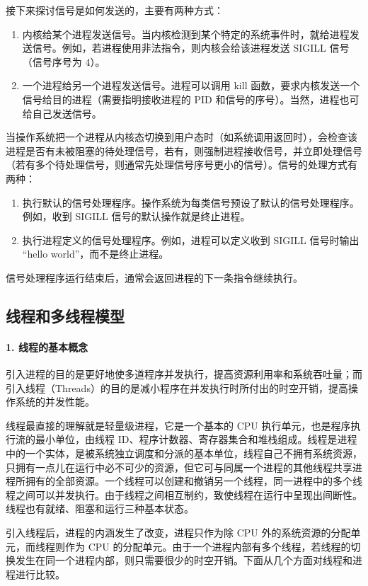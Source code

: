 \documentclass{ctexbook}
\begin{document}
	接下来探讨信号是如何发送的，主要有两种方式：
	\begin{enumerate}
		\item 内核给某个进程发送信号。当内核检测到某个特定的系统事件时，就给进程发送信号。例如，若进程使用非法指令，则内核会给该进程发送 SIGILL 信号（信号序号为 4）。
		\item 一个进程给另一个进程发送信号。进程可以调用 kill 函数，要求内核发送一个信号给目的进程（需要指明接收进程的 PID 和信号的序号）。当然，进程也可给自己发送信号。
	\end{enumerate}
	
	当操作系统把一个进程从内核态切换到用户态时（如系统调用返回时），会检查该进程是否有未被阻塞的待处理信号，若有，则强制进程接收信号，并立即处理信号（若有多个待处理信号，则通常先处理信号序号更小的信号）。信号的处理方式有两种：
	\begin{enumerate}
		\item 执行默认的信号处理程序。操作系统为每类信号预设了默认的信号处理程序。例如，收到 SIGILL 信号的默认操作就是终止进程。
		\item 执行进程定义的信号处理程序。例如，进程可以定义收到 SIGILL 信号时输出 “hello world”，而不是终止进程。
	\end{enumerate}
	
	信号处理程序运行结束后，通常会返回进程的下一条指令继续执行。
	
	\subsection{线程和多线程模型}
	
	\paragraph{1. 线程的基本概念}
	
	引入进程的目的是更好地使多道程序并发执行，提高资源利用率和系统吞吐量；而引入线程（Threads）的目的是减小程序在并发执行时所付出的时空开销，提高操作系统的并发性能。
	
	线程最直接的理解就是轻量级进程，它是一个基本的 CPU 执行单元，也是程序执行流的最小单位，由线程 ID、程序计数器、寄存器集合和堆栈组成。线程是进程中的一个实体，是被系统独立调度和分派的基本单位，线程自己不拥有系统资源，只拥有一点儿在运行中必不可少的资源，但它可与同属一个进程的其他线程共享进程所拥有的全部资源。一个线程可以创建和撤销另一个线程，同一进程中的多个线程之间可以并发执行。由于线程之间相互制约，致使线程在运行中呈现出间断性。线程也有就绪、阻塞和运行三种基本状态。
	
	引入线程后，进程的内涵发生了改变，进程只作为除 CPU 外的系统资源的分配单元，而线程则作为 CPU 的分配单元。由于一个进程内部有多个线程，若线程的切换发生在同一个进程内部，则只需要很少的时空开销。下面从几个方面对线程和进程进行比较。
	
\end{document}
